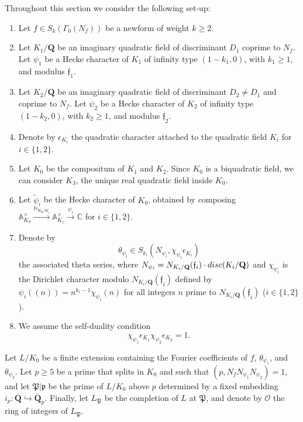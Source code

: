\documentclass[10pt,letterpaper]{amsart}
\theoremstyle{plain}
\theoremstyle{definition}
\theoremstyle{definition}
\theoremstyle{plain}
\theoremstyle{plain}
\theoremstyle{plain}
\theoremstyle{remark}
\numberwithin{equation}{section}
\newcommand{\fkf}{\mathfrak{f}}
\def\cO{\mathcal O}
\newcommand{\Q}{\mathbf{Q}}
\begin{document}
Throughout this section  we consider the following  set-up:
\begin{enumerate}
    \item Let $f\in S_k(\Gamma_0(N_f))$ be a newform of weight $k\geq 2$.
    \item Let $K_1/\Q$ be an imaginary quadratic field of discriminant $D_1$ coprime to $N_f$. Let $\psi_1$ be a Hecke character of $K_1$ of infinity type $(1-k_1,0)$, with $k_1\geq 1$, and modulus  $\fkf_1$.
    \item  Let $K_2/\Q$ be an imaginary quadratic field of discriminant $D_2\neq D_1$ and coprime to $N_f$. Let $\psi_2$ be a Hecke character of $K_2$ of infinity type $(1-k_2,0)$, with $k_2\geq 1$, and modulus  $\fkf_2$.
    \item Denote by $\epsilon_{K_i}$ the quadratic character attached to the quadratic field $K_i$ for $i\in\{1,2\}$.
    \item Let $K_0$ be the compositum of $K_1$ and $K_2$. Since $K_0$ is a biquadratic field, we can consider $K_3$, the unique real quadratic field inside $K_0$. 
    \item Let $\tilde{\psi}_i$ be the Hecke character of $K_0$, obtained by composing $\mathbb{A}_{K_0}^{\times}\xrightarrow{\mathbb{N}_{K_0/K_i}}\mathbb{A}_{K_i}^{\times}\xrightarrow{\psi_i}\mathbb{C}$ for $i\in\{1,2\}$.
    \item Denote by 
    \[\theta_{\psi_i}\in S_{k_i}(N_{\psi_i},\chi_{\psi_i}\epsilon_{K_i}) \]
    the associated theta series, where $N_{\psi_i}=N_{K_i/\Q}(\fkf_i)\cdot{\rm disc}(K_i/\Q)$ and $\chi_{\psi_i}$ is the Dirichlet character modulo $N_{K_i/\Q}(\fkf_i)$ defined by $\psi_i((n))=n^{k_i-1}\chi_{\psi_i}(n)$ for all integers $n$ prime to $N_{K_i/\Q}(\fkf_i)$ ($i\in\{1,2\}$). 
    \item We assume the self-duality condition
    \begin{equation}\label{eq:self-dual}
{\chi_{\psi_1}\epsilon_{K_1}\chi_{\psi_2}\epsilon_{K_2}=1}.
    \end{equation}
\end{enumerate}



Let $L/K_0$ be a finite extension containing the Fourier coefficients of $f$, $\theta_{\psi_1}$, and $\theta_{\psi_2}$. Let $p\geq 5$ be a prime that splits in $K_0$ and such that $(p,N_fN_{\psi_1}N_{\psi_2})=1$, and let $\mathfrak{P}\vert\mathfrak{p}$ be the prime of  $L/K_0$ above $p$ determined by a fixed embedding $i_p:\overline{\Q}\hookrightarrow\overline{\Q}_p$. Finally, let $L_\mathfrak{P}$ be the completion of $L$ at $\mathfrak{P}$, and denote by $\cO$ the ring of integers of $L_{\mathfrak{P}}$.
\end{document}
